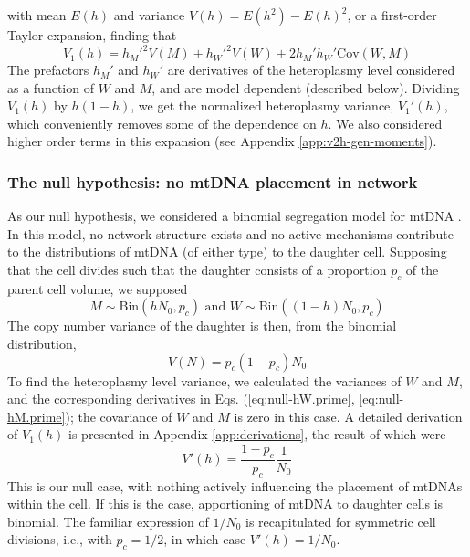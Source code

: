 \documentclass{article}
\newcommand{\be}{\begin{equation}}
\newcommand{\ee}{\end{equation}}
\begin{document}
with mean $E(h)$ and variance $V(h) = E(h^2) - E(h)^2$, or a first-order Taylor expansion, finding that
\begin{equation}\label{eq:v1h-gen}
V_1(h) = h_M'^2V(M)+h_W'^2V(W)+2h_M'h_W'\mathrm{Cov}(W,M)
\end{equation}
The prefactors $h_M'$ and $h_W'$ are derivatives of the heteroplasmy level considered as a function of $W$ and $M$, and are model dependent (described below). Dividing $V_1(h)$ by $h(1-h)$, we get the normalized heteroplasmy variance, $V_1'(h)$, which conveniently removes some of the dependence on $h$. We also considered higher order terms in this expansion (see Appendix \ref{app:v2h-gen-moments}).

\subsubsection*{The null hypothesis: no mtDNA placement in network}
As our null hypothesis, we considered a binomial segregation model for mtDNA \citep{johnston2019varied}. In this model, no network structure exists and no active mechanisms contribute to the distributions of mtDNA (of either type) to the daughter cell. Supposing that the cell divides such that the daughter consists of a proportion $p_c$ of the parent cell volume, we supposed
\be\label{eq:model-null}
M\sim \mathrm{Bin}(hN_0,p_c) \text{ and } W\sim\mathrm{Bin}((1-h)N_0,p_c)
\ee
The copy number variance of the daughter is then, from the binomial distribution,
\begin{equation}\label{eq:vn-null}
    V(N)=p_c(1-p_c)N_0
\end{equation}
To find the heteroplasmy level variance, we calculated the variances of $W$ and $M$, and the corresponding derivatives in Eqs. (\ref{eq:null-hW.prime}, \ref{eq:null-hM.prime}); the covariance of $W$ and $M$ is zero in this case. A detailed derivation of $V_1(h)$ is presented in Appendix \ref{app:derivations}, the result of which were
\begin{equation}\label{eq:vh-null}
V'(h)=\frac{1-p_c}{p_c} \frac{1}{N_0}
\end{equation}
This is our null case, with nothing actively influencing the placement of mtDNAs within the cell. If this is the case, apportioning of mtDNA to daughter cells is binomial. The familiar expression of $1/N_0$ is recapitulated for symmetric cell divisions, i.e., with $p_c=1/2$, in which case $V'(h)=1/N_0$.
\end{document}
